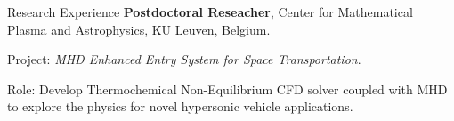 \begin{rubric}{Research Experience}
\entry*[2020 -- present]%
	\textbf{Postdoctoral Reseacher}, Center for Mathematical Plasma and Astrophysics, KU Leuven, Belgium. \par
	 {Project}: \emph{MHD Enhanced Entry System for Space Transportation}. \par
     {Role}: Develop Thermochemical Non-Equilibrium CFD solver coupled with MHD to explore the physics for novel hypersonic vehicle applications.
\end{rubric}